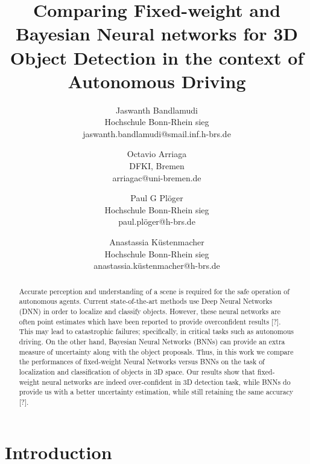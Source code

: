 \documentclass[10pt,twocolumn,letterpaper]{article}
\begin{document}
\title{Comparing Fixed-weight and Bayesian Neural networks for 3D Object Detection in the context of Autonomous Driving}

\author{
Jaswanth Bandlamudi\\
{Hochschule Bonn-Rhein sieg\\
 jaswanth.bandlamudi@smail.inf.h-brs.de}
\and 
Octavio Arriaga\\
{DFKI, Bremen\\
 arriagac@uni-bremen.de}
\and
Paul G Pl\"{o}ger\\
{Hochschule Bonn-Rhein sieg\\
 paul.pl\"{o}ger@h-brs.de}
\and
Anastassia K\"{u}stenmacher\\
{Hochschule Bonn-Rhein sieg\\
 anastassia.k\"{u}stenmacher@h-brs.de}

}

\maketitle

\begin{abstract}
    Accurate perception and understanding of a scene is required for the safe operation of autonomous agents. Current state-of-the-art methods use Deep Neural Networks (DNN) in order to localize and classify objects. However, these neural networks are often point estimates which have been reported to provide overconfident results [?]. This may lead to catastrophic failures; specifically, in critical tasks such as autonomous driving. On the other hand, Bayesian Neural Networks (BNNs) can provide an extra measure of uncertainty along with the object proposals. Thus, in this work we compare the performances of fixed-weight Neural Networks versus BNNs on the task of localization and classification of objects in 3D space. Our results show that fixed-weight neural networks are indeed over-confident in 3D detection task, while BNNs do provide us with a better uncertainty estimation, while still retaining the same accuracy [?].
\end{abstract}

\section{Introduction}
\end{document}
